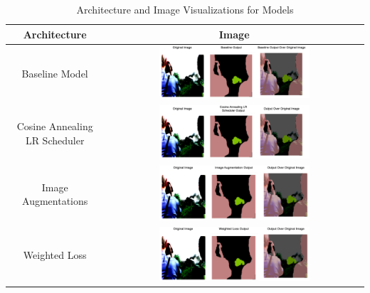 \documentclass{article}
\begin{document}
\begin{table}[H]
\centering
\begin{tabular}{|c|c|}
\hline
\textbf{Architecture} & \textbf{Image} \\
\hline
Baseline Model & \includegraphics[width=0.6\textwidth]{baseline_images.png} \\
\hline
Cosine Annealing LR Scheduler & \includegraphics[width=0.6\textwidth]{annealing_pictures.png} \\
\hline
Image Augmentations & \includegraphics[width=0.6\textwidth]{augmentation_pictures.png} \\
\hline
Weighted Loss  & \includegraphics[width=0.6\textwidth]{weighted_loss_images.png} \\
\hline
\end{tabular}
\caption{Architecture and Image Visualizations for Models}
\label{tab:architecture_images}
\end{table}
\end{document}
